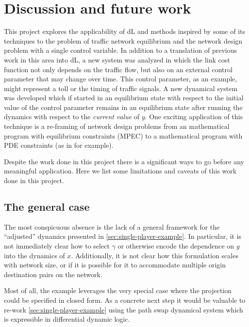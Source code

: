 \section{Discussion and future work}\label{sec:discussion}

This project explores the applicability of dL and methods inspired by some of its techniques to the problem of traffic network equilibrium and the network design problem with a single control variable. 
In addition to a translation of previous work in this area into dL, a new system was analyzed in which the link cost function not only depends on the traffic flow, but also on an external control parameter that may change over time.
This control parameter, as an example, might represent a toll or the timing of traffic signals.
A new dynamical system was developed which if started in an equilibrium state with respect to the initial value of the control parameter remains in an equilibrium state after running the dynamics with respect to the \textit{current value} of $y$.
One exciting application of this technique is a re-framing of network design problems from an mathematical program with equilibrium constraints (MPEC) to a mathematical program with PDE constraints (as in \citet{Biegler2003:pde-constraints} for example). 

Despite the work done in this project there is a significant ways to go before any meaningful application.
Here we list some limitations and caveats of this work done in this project.

\subsection{The general case}

The most conspicuous absence is the lack of a general framework for the ``adjusted'' dynamics presented in \cref{sec:single-player-example}. In particular, it is not immediately clear how to select $\gamma$ or otherwise encode the dependence on $y$ into the dynamics of $x$. Additionally, it is not clear how this formulation scales with network size, or if it is possible for it to accommodate multiple origin destination pairs on the network.

Most of all, the example leverages the very special case where the projection could be specified in closed form.
As a concrete next step it would be valuable to re-work \cref{sec:single-player-example} using the path swap dynamical system which is expressible in differential dynamic logic.


